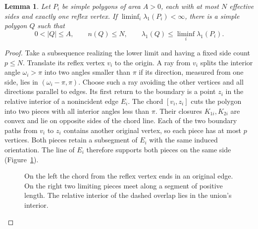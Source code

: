 \documentclass[11pt,a4paper,reqno]{amsart}
\newtheorem{lemma}[theorem]{Lemma}
\theoremstyle{remark}
\numberwithin{equation}{section}
\begin{document}
\begin{lemma}\label{lem:compact}
Let $P_i$ be simple polygons of area $A>0$, each with at most $N$ effective
sides and exactly one reflex vertex. If $\liminf_i\lambda_1(P_i)<\infty$,
there is a simple polygon $Q$ such that
\begin{equation}\label{eq:compact}
  0<|Q|\le A,\qquad n(Q)\le N,\qquad
  \lambda_1(Q)\le\liminf_i\lambda_1(P_i).
\end{equation}
\end{lemma}

\begin{proof}
Take a subsequence realizing the lower limit and having a fixed side count
$p\le N$. Translate its reflex vertex $v_i$ to the origin. A ray from $v_i$
splits the interior angle $\omega_i>\pi$ into two angles smaller than $\pi$
if its direction, measured from one side, lies in $(\omega_i-\pi,\pi)$.
Choose such a ray avoiding the other vertices and all directions parallel
to edges. Its first return to the boundary is a point $z_i$ in the relative
interior of a nonincident edge $E_i$. The chord $[v_i,z_i]$ cuts the polygon
into two pieces with all interior angles less than $\pi$. Their closures
$K_{1i},K_{2i}$ are convex and lie on opposite sides of the chord line.
Each of the two boundary paths from $v_i$ to $z_i$ contains another original
vertex, so each piece has at most $p$ vertices. Both pieces retain a
subsegment of $E_i$ with the same induced orientation. The line of $E_i$
therefore supports both pieces on the same side (Figure~\ref{fig:cut}).

\begin{figure}[htbp]
\centering
{}
\caption{On the left the chord from the reflex vertex ends in an original
edge. On the right two limiting pieces meet along a segment of positive
length. The relative interior of the dashed overlap lies in the union's
interior.}\label{fig:cut}
\end{figure}


\end{proof}
\end{document}
